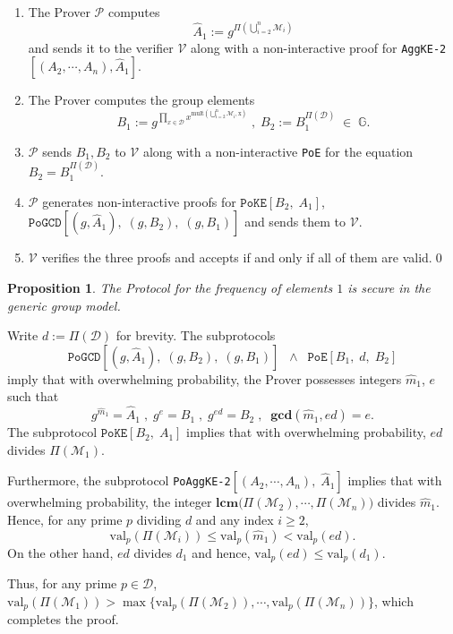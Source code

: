 \documentclass[11pt, lettersize, notitlepage, leqno, footskip=0.6cm]{article}
\newcommand{\pl}{\prod\limits}
\newcommand{\ttt}{\texttt}
\newcommand{\bG}{\mathbb{G}}
\newcommand{\mc}{\mathcal}
\newcommand{\mbf}{\mathbf}
\newcommand{\mr}{\mathrm}
\newcommand{\what}{\widehat}
\newcommand{\mP}{\mc{P}}
\newcommand{\V}{\mc{V}}
\newcommand{\mcM}{\mc{M}}
\newcommand{\vs}{\vspace{-0.15cm}}
\newcommand{\op}{overwhelming probability}
\newcommand{\LCM}{\mbf{lcm}}
\newcommand{\GCD}{\mbf{gcd}}
\newtheorem{Prop}[Thm]{Proposition}
\numberwithin{equation}{section}
\begin{document}
\begin{enumerate}[wide, labelwidth=!, labelindent=0pt] \vs

\item The Prover $\mP$ computes \vs $$\what{A}_1:= g^{\Pi\left(\bigcup\limits_{i=2}^n \mc{M}_i\right)} $$ and sends it to the verifier $\V$ along with a non-interactive proof for \verb|AggKE-2|$[(A_2,\cdots,A_n), \what{A}_1]$. \vs

\item The Prover computes the group elements \vs $$B_1:= g^{\pl_{x\in \mc{D}} x^{\mr{mult\left(\bigcup\limits_{i=2}^n \mc{M}_i, x\right)}}}\;,\;B_2:= B_1^{\Pi(\mc{D})} \;\in\; \bG.$$ \vspace{-0.8cm}

\item $\mP$ sends $B_1, B_2$ to $\V$ along with a non-interactive \verb|PoE| for the equation $B_2= B_1^{\Pi(\mc{D})}$. \vs

\item $\mP$ generates non-interactive proofs for $\ttt{PoKE}[B_2,\;A_1]$, $\ttt{PoGCD}[(g, \what{A}_1),\;(g, B_2),\;(g, B_1)]$ and sends them to $\V$.\vs

\item $\V$ verifies the three proofs and accepts if and only if all of them are valid.\qed\end{enumerate}

\begin{Prop} The Protocol for the frequency of elements $1$ is secure in the generic group model. \end{Prop}

\begin{prf} Write $d:= \Pi(\mc{D})$ for brevity. The subprotocols \vs $$\ttt{PoGCD}[(g, \what{A}_1),\;(g, B_2),\;(g, B_1)]\;\;\wedge \;\;\ttt{PoE}[B_1,\; d,\; B_2]$$ imply that with \op, the Prover possesses integers $\what{m}_1$, $e$ such that \vs $$ g^{\what{m}_1} = \what{A}_1\;,\;g^{e} = B_1\;,\; g^{ed} = B_2\;,\;\;\GCD(\what{m}_1,ed) = e.$$ The subprotocol $\ttt{PoKE}[B_2,\;A_1]$ implies that with \op, $ed$ divides $\Pi(\mcM_1)$. 

Furthermore, the subprotocol \verb|PoAggKE-2|$[(A_2,\cdots,A_n),\; \what{A}_1]$ implies that with \op, the integer $\LCM\big(\Pi(\mcM_2),\cdots, \Pi(\mcM_n)\big)$ divides $\what{m}_1$. Hence, for any prime $p$ dividing $d$ and any index $i\geq 2$, \vs $$\mr{val}_p(\Pi(\mcM_i))\leq  \mr{val}_p(\what{m}_1) < \mr{val}_p(ed).$$ On the other hand, $ed$ divides $d_1$ and hence, $\mr{val}_p(ed)\leq \mr{val}_p(d_1)$. 

Thus, for any prime $p \in \mc{D}$, $\mr{val}_p(\Pi(\mcM_1))> \max\big\{\mr{val}_p(\Pi(\mcM_2)),\cdots, \mr{val}_p(\Pi(\mcM_n))\big\}$, which completes the proof.\end{prf}
\end{document}

